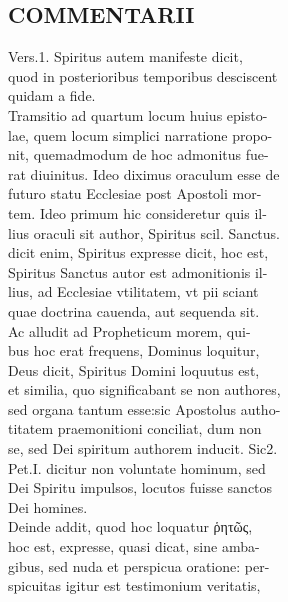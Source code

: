 \documentclass{article}
\begin{document}
\begin{pages}
\section*{COMMENTARII \\
                }Vers.1. Spiritus autem manifeste dicit, \\
                quod in posterioribus temporibus desciscent \\
                quidam a fide. \\
                Tramsitio ad quartum locum huius episto- \\
                lae, quem locum simplici narratione propo- \\
                nit, quemadmodum de hoc admonitus fue- \\
                rat diuinitus. Ideo diximus oraculum esse de \\
                futuro statu Ecclesiae post Apostoli mor- \\
                tem. Ideo primum hic consideretur quis il- \\
                lius oraculi sit author, Spiritus scil. Sanctus. \\
                dicit enim, Spiritus expresse dicit, hoc est, \\
                Spiritus Sanctus autor est admonitionis il- \\
                lius, ad Ecclesiae vtilitatem, vt pii sciant \\
                quae doctrina cauenda, aut sequenda sit. \\
                Ac alludit ad Propheticum morem, qui- \\
                bus hoc erat frequens, Dominus loquitur, \\
                Deus dicit, Spiritus Domini loquutus est, \\
                et similia, quo significabant se non authores, \\
                sed organa tantum esse:sic Apostolus autho- \\
                titatem praemonitioni conciliat, dum non \\
                se, sed Dei spiritum authorem inducit. Sic2. \\
                Pet.I. dicitur non voluntate hominum, sed \\
                Dei Spiritu impulsos, locutos fuisse sanctos \\
                Dei homines. \\
                Deinde addit, quod hoc loquatur ῥητῶς, \\
                hoc est, expresse, quasi dicat, sine amba- \\
                gibus, sed nuda et perspicua oratione: per- \\
                spicuitas igitur est testimonium veritatis, \\
                

\end{pages}
\end{document}
